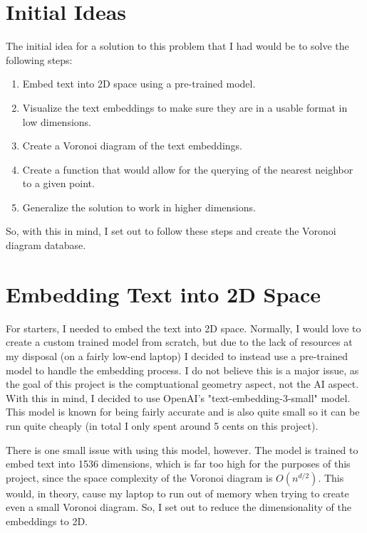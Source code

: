 \documentclass{article}
\begin{document}
\section{Initial Ideas}
The initial idea for a solution to this problem that I had would be to
solve the following steps:

\begin{enumerate}
	\item Embed text into 2D space using a pre-trained model.
	\item Visualize the text embeddings to make sure they are in a
        usable format in low dimensions.
    \item Create a Voronoi diagram of the text embeddings.
	\item Create a function that would allow for the querying of the
		nearest neighbor to a given point.
	\item Generalize the solution to work in higher dimensions.
\end{enumerate}

\noindent
So, with this in mind, I set out to follow these steps and create the
Voronoi diagram database. 
\section{Embedding Text into 2D Space}
For starters, I needed to embed the text into 2D space. Normally, I would
love to create a custom trained model from scratch, but due to the lack of 
resources at my disposal (on a fairly low-end laptop) I decided to instead
use a pre-trained model to handle the embedding process. I do not believe this
is a major issue, as the goal of this project is the comptuational geometry
aspect, not the AI aspect. With this in mind, I decided to use OpenAI's "text-embedding-3-small" model.
This model is known for being fairly accurate and is also quite small so 
it can be run quite cheaply (in total I only spent around 5 cents on this project).
\newline

\noindent
There is one small issue with using this model, however. The model is trained
to embed text into 1536 dimensions, which is far too high for the purposes of this project,
since the space complexity of the Voronoi diagram is $O(n^{d/2})$. This would, in theory, 
cause my laptop to run out of memory when trying to create even a small Voronoi diagram.
So, I set out to reduce the dimensionality of the embeddings to 2D.
\end{document}
